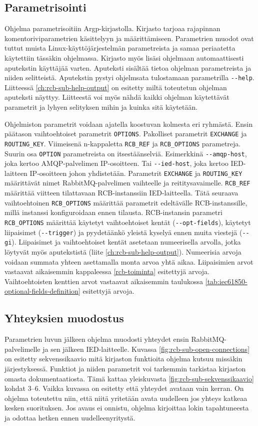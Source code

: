 \subsection{Parametrisointi}
Ohjelma parametrisoitiin Argp-kirjastolla. Kirjasto tarjoaa rajapinnan komentoriviparametrien käsittelyyn ja määrittämiseen. Parametrien muodot ovat tuttut muista Linux-käyttöjärjestelmän parametreista ja samaa periaatetta käytettiin tässäkin ohjelmassa. Kirjasto myös lisäsi ohjelmaan automaattisesti aputekstin käyttäjää varten. Aputeksti sisältää tietoa ohjelman parametreista ja niiden selitteistä. Aputekstin pystyi ohjelmsata tulostamaan parametrilla \texttt{-{}-help}. Liitteessä \ref{ch:rcb-sub-help-output} on esitetty miltä toteutetun ohjelman aputeksti näyttyy. Liitteestä voi myös nähdä kaikki ohjelman käytettävät parametrit ja lyhyen selityksen mihin ja kuinka sitä käytetään.

Ohjelmiston parametrit voidaan ajatella koostuvan kolmesta eri ryhmästä. Ensin päätason vaihtoehtoiset parametrit \texttt{OPTIONS}. Pakolliset parametrit \texttt{EXCHANGE} ja \texttt{ROUTING\_KEY}. Viimeisenä n-kappaletta \texttt{RCB\_REF} ja \texttt{RCB\_OPTIONS} parametreja. Suurin osa \texttt{OPTION} parametreista on itsestäänselviä. Esimerkkinä \texttt{-{}-amqp-host}, joka kertoo AMQP-palvelimen IP-osoitteen. Tai \texttt{-{}-ied-host}, joka kertoo IED-laitteen IP-osoitteen johon yhdistetään. Parametrit \texttt{EXCHANGE} ja \texttt{ROUTING\_KEY} määrittävät nimet RabbitMQ-palvelimen vaihteelle ja reititysavaimelle. \texttt{RCB\_REF} määrittää viitteen tilattavaan RCB-instanssiin IED-laitteella. Tätä seuraava vaihtoehtoinen \texttt{RCB\_OPTIONS} määrittää parametrit edeltävälle RCB-instanssille, millä instanssi konfiguroidaan ennen tilausta. RCB-instansin parametri \texttt{RCB\_OPTIONS} määrittää käytetyt vaihtoehtoiset kentät (\texttt{-{}-opt-fields}), käytetyt liipaisimet (\texttt{-{}-trigger}) ja pyydetäänkö yleistä kyselyä ennen muita viestejä (\texttt{-{}-gi}). Liipaisimet ja vaihtoehtoiset kentät asetetaan numeerisella arvolla, jotka löytyvät myös aputekstistä (liite \ref{ch:rcb-sub-help-output}). Numeerisia arvoja voidaan summata yhteen asettamalla monta arvoa yhtä aikaa. Liipaisimien arvot vastaavat aikaisemmin kappaleessa \ref{rcb-toiminta} esitettyjä arvoja. Vaihtoehtoisten kenttien arvot vastaavat aikaisemmin taulukossa \ref{tab:iec61850-optional-fields-definition} esitettyjä arvoja.

\subsection{Yhteyksien muodostus}
Parametrien luvun jälkeen ohjelma muodosti yhteydet ensin RabbitMQ-palvelimelle ja sen jälkeen IED-laitteelle. Kuvassa \ref{fig:rcb-sub-open-connections} on esitetty sekvenssikaavio mitä kirjaston funktioita ohjelma kutsuu missäkin järjestyksessä. Funktiot ja niiden parametrit voi tarkemmin tarkistaa kirjaston omasta dokumentaatiosta. Tämä kattaa yleiskuvasta \ref{fig:rcb-sub-sekvenssikaavio} kohdat 3--6. Vaikka kuvassa on esitetty että yhteydet avataan vain kerran. On ohjelma toteutettu niin, että niitä yritetään avata uudelleen jos yhteys katkeaa kesken suorituksen. Jos avaus ei onnistu, ohjelma kirjoittaa lokin tapahtuneesta ja odottaa hetken ennen uudelleenyritystä.

